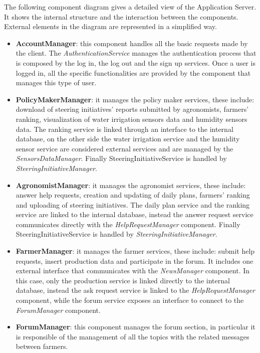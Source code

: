 \documentclass[table, 12pt]{article}
\begin{document}
The following component diagram gives a detailed view of the Application Server. It shows the internal structure and the interaction between the components.
External elements in the diagram are represented in a simplified way.
\begin{itemize}
    \item \textbf{AccountManager}: this component handles all the basic requests made by the client.
    The \textit{AuthenticationService} manages the authentication process that is composed by the log in, the log out and the sign up services. 
    Once a user is logged in, all the specific functionalities are provided by the component that manages this type of user.
    \item \textbf{PolicyMakerManager}: it manages the policy maker services, these include: download of steering initiatives' reports submitted by agronomists, farmers' ranking, visualization of water irrigation sensors data and humidity sensors data.
    The ranking service is linked through an interface to the internal database, on the other side the water irrigation service and the humidity sensor service are considered external services and are managed by the \textit{SensorsDataManager}. Finally SteeringInitiativeService is handled by \textit{SteeringInitiativeManager}.
    \item \textbf{AgronomistManager}: it manages the agronomist services, these include: answer help requests, creation and updating of daily plans, farmers' ranking and uploading of steering initiatives.
    The daily plan service and the ranking service are linked to the internal database, instead the answer request service communicates directly with the \textit{HelpRequestManager} component. Finally SteeringInitiativeService is handled by \textit{SteeringInitiativeManager}.
    \item \textbf{FarmerManager}: it manages the farmer services, these include: submit help requests, insert production data and participate in the forum.
    It includes one external interface that communicates with the \textit{NewsManager} component.
    In this case, only the production service is linked directly to the internal database, instead the ask request service is linked to the \textit{HelpRequestManager} component, while the forum service exposes an interface to connect to the \textit{ForumManager} component.
    \item \textbf{ForumManager}: this component manages the forum section, in particular it is responsible of the management of all the topics with the related messages between farmers.

\end{itemize}
\end{document}
